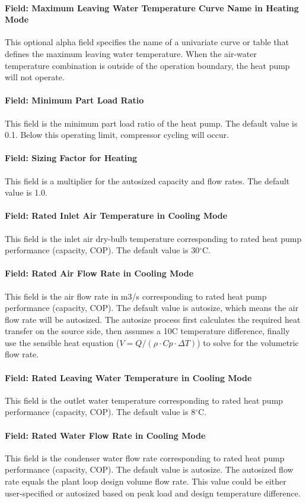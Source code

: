 \paragraph{Field: Maximum Leaving Water Temperature Curve Name in Heating Mode}
This optional alpha field specifies the name of a univariate curve or table that defines
the maximum leaving water temperature. When the air-water temperature combination is outside of
the operation boundary, the heat pump will not operate.
\paragraph{Field: Minimum Part Load Ratio} This field is the minimum part load
ratio of the heat pump. The default value is 0.1. Below this operating limit,
compressor cycling will occur.
\paragraph{Field: Sizing Factor for Heating} This field is a multiplier for the
autosized capacity and flow rates. The default value is 1.0.
\paragraph{Field: Rated Inlet Air Temperature in Cooling Mode} This field is the
inlet air dry-bulb temperature corresponding to rated heat pump performance
(capacity, COP). The default value is 30$^\circ$C.
\paragraph{Field: Rated Air Flow Rate in Cooling Mode} This field is the air
flow rate in m3/s corresponding to rated heat pump performance (capacity, COP).
The default value is autosize, which means the air flow rate will be autosized.
The autosize process first calculates the required heat transfer on the source
side, then assumes a 10C temperature difference, finally use the sensible heat
equation ($V = Q / (\rho \cdot Cp \cdot \Delta T)$) to solve for the volumetric flow rate.
\paragraph{Field: Rated Leaving Water Temperature in Cooling Mode} This field is
the outlet water temperature corresponding to rated heat pump performance
(capacity, COP). The default value is 8$^\circ$C.
\paragraph{Field: Rated Water Flow Rate in Cooling Mode} This field is the
condenser water flow rate corresponding to rated heat pump performance
(capacity, COP). The default value is autosize.
The autosized flow rate equals the plant loop design volume flow rate.
This value could be either user-specified or autosized based on peak load and design
temperature difference.
